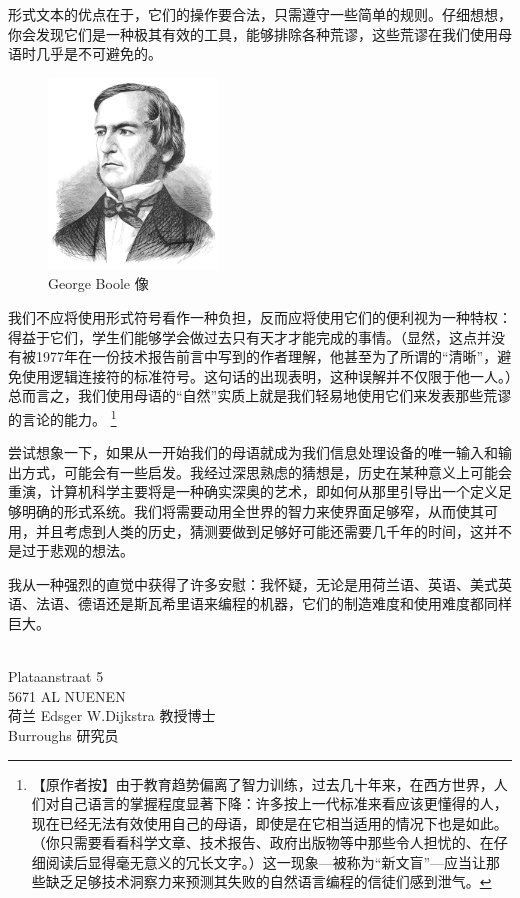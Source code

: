 \documentclass[a4paper,12pt]{article}
\begin{document}
形式文本的优点在于，它们的操作要合法，只需遵守一些简单的规则。仔细想想，你会发现它们是一种极其有效的工具，能够排除各种荒谬，这些荒谬在我们使用母语时几乎是不可避免的。

\begin{figure}[ht]
\centering
\includegraphics[height=2.0in]{images/George_Boole.jpeg}
\caption{George Boole 像}
\end{figure}

我们不应将使用形式符号看作一种负担，反而应将使用它们的便利视为一种特权：得益于它们，学生们能够学会做过去只有天才才能完成的事情。（显然，这点并没有被1977年在一份技术报告前言中写到的作者理解，他甚至为了所谓的“清晰”，避免使用逻辑连接符的标准符号。这句话的出现表明，这种误解并不仅限于他一人。）总而言之，我们使用母语的“自然”实质上就是我们轻易地使用它们来发表那些荒谬的言论的能力。
\footnote{【原作者按】由于教育趋势偏离了智力训练，过去几十年来，在西方世界，人们对自己语言的掌握程度显著下降：许多按上一代标准来看应该更懂得的人，现在已经无法有效使用自己的母语，即使是在它相当适用的情况下也是如此。（你只需要看看科学文章、技术报告、政府出版物等中那些令人担忧的、在仔细阅读后显得毫无意义的冗长文字。）这一现象—被称为“新文盲”—应当让那些缺乏足够技术洞察力来预测其失败的自然语言编程的信徒们感到泄气。}

尝试想象一下，如果从一开始我们的母语就成为我们信息处理设备的唯一输入和输出方式，可能会有一些启发。我经过深思熟虑的猜想是，历史在某种意义上可能会重演，计算机科学主要将是一种确实深奥的艺术，即如何从那里引导出一个定义足够明确的形式系统。我们将需要动用全世界的智力来使界面足够窄，从而使其可用，并且考虑到人类的历史，猜测要做到足够好可能还需要几千年的时间，这并不是过于悲观的想法。

我从一种强烈的直觉中获得了许多安慰：我怀疑，无论是用荷兰语、英语、美式英语、法语、德语还是斯瓦希里语来编程的机器，它们的制造难度和使用难度都同样巨大。

　\\Plataanstraat 5\\
5671 AL NUENEN\\
荷兰 Edsger W.Dijkstra 教授博士\\
Burroughs 研究员\\
\end{document}
